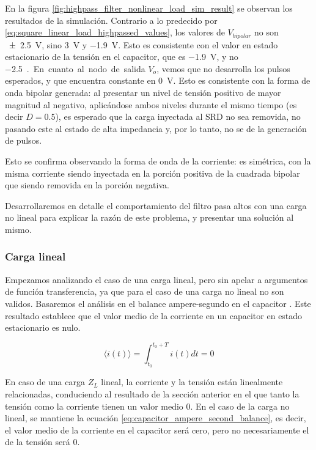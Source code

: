 En la figura \ref{fig:highpass_filter_nonlinear_load_sim_result} se observan los
resultados de la simulación. Contrario a lo predecido por
\ref{eq:square_linear_load_highpassed_values}, los valores de $V_{bipolar}$ no
son \qty{\pm2.5}{\volt}, sino \qty{3}{\volt} y \qty{-1.9}{\volt}. Esto es
consistente con el valor en estado estacionario de la tensión en el capacitor,
que es \qty{-1.9}{\volt}, y no \qty{-2.5}{\volt.}

En cuanto al nodo de salida $V_o$, vemos que no desarrolla los pulsos esperados,
y que encuentra constante en \qty{0}{\volt}. Esto es consistente con la forma de
onda bipolar generada: al presentar un nivel de tensión positivo de mayor
magnitud al negativo, aplicándose ambos niveles durante el mismo tiempo (es
decir $D=0.5$), es esperado que la carga inyectada al SRD no sea removida, no
pasando este al estado de alta impedancia y, por lo tanto, no se de la
generación de pulsos.

Esto se confirma observando la forma de onda de la corriente: es simétrica, con
la misma corriente siendo inyectada en la porción positiva de la cuadrada
bipolar que siendo removida en la porción negativa.

Desarrollaremos en detalle el comportamiento del filtro pasa altos con una carga
no lineal para explicar la razón de este problema, y presentar una solución al
mismo.

\subsubsection{Carga lineal}

Empezamos analizando el caso de una carga lineal, pero sin apelar a argumentos
de función transferencia, ya que para el caso de una carga no lineal no son
validos. Basaremos el análisis en el balance ampere-segundo en el capacitor
\cite{Erickson_Robert_W_2020}. Este resultado establece que el valor medio de la
corriente en un capacitor en estado estacionario es nulo.

\begin{equation}
    \label{eq:capacitor_ampere_second_balance}
    \langle i(t) \rangle = \int_{t_0}^{t_0+T} i(t)dt = 0
\end{equation}

En caso de una carga $Z_L$ lineal, la corriente y la tensión están linealmente
relacionadas, conduciendo al resultado de la sección anterior en el que tanto la
tensión como la corriente tienen un valor medio 0. En el caso de la carga no
lineal, se mantiene la ecuación \ref{eq:capacitor_ampere_second_balance}, es
decir, el valor medio de la corriente en el capacitor será cero, pero no
necesariamente el de la tensión será 0.

